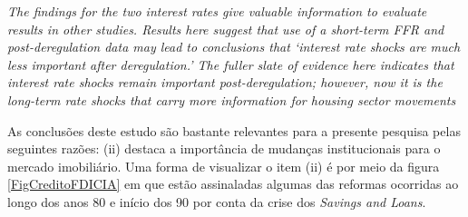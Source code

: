 \begin{citacao}
	\textit{The findings for the two interest rates give valuable information to evaluate results in
	other studies. Results here suggest that use of a short-term FFR and post-deregulation data
	may lead to conclusions that `interest rate shocks are much less important after
	deregulation.' The fuller slate of evidence here indicates that interest rate shocks remain
	important post-deregulation; however, now it is the long-term rate shocks that carry more
	information for housing sector movements} \cite[p.~346]{gauger_residential_2003}
\end{citacao}

As conclusões deste estudo são bastante relevantes para a presente pesquisa pelas seguintes razões: 
	(ii) destaca a importância de mudanças institucionais para o mercado imobiliário.
Uma forma de visualizar o item (ii) é por meio da figura \ref{FigCreditoFDICIA} em que estão assinaladas algumas das reformas ocorridas ao longo dos anos 80 e início dos 90 por conta da crise dos \textit{Savings and Loans}.
